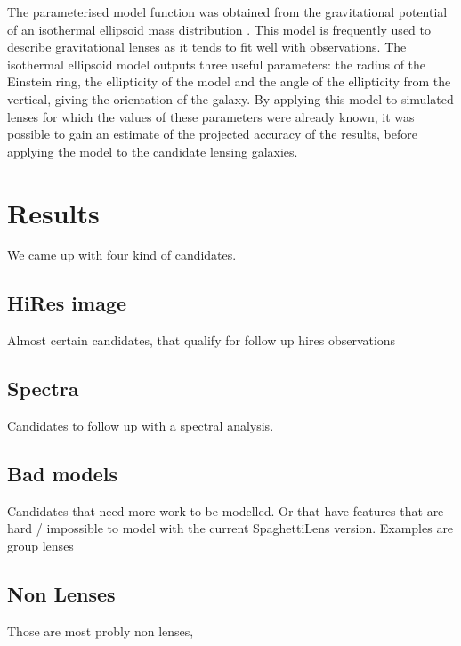 \documentclass[a4paper,fleqn,usenatbib]{mnras}
\begin{document}
The parameterised model function was obtained from the gravitational potential of an isothermal ellipsoid mass distribution \cite{2001astro.ph..2340K}.
This model is frequently used to describe gravitational lenses as it tends to fit well with observations.
The isothermal ellipsoid model outputs three useful parameters: the radius of the Einstein ring, the ellipticity of the model and the angle of the ellipticity from the vertical, giving the orientation of the galaxy.
By applying this model to simulated lenses for which the values of these parameters were already known, it was possible to gain an estimate of the projected accuracy of the results, before applying the model to the candidate lensing galaxies.





\section{Results}
We came up with four kind of candidates.

\subsection{HiRes image}
Almost certain candidates, that qualify for follow up hires observations



\subsection{Spectra}
Candidates to follow up with a spectral analysis. 


\subsection{Bad models}
Candidates that need more work to be modelled.
Or that have features that are hard / impossible to model with the current SpaghettiLens version.
Examples are group lenses



\subsection{Non Lenses}
Those are most probly non lenses, 
\end{document}
